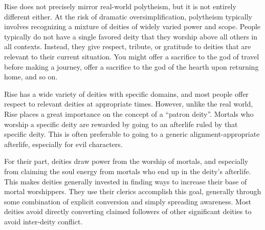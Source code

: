         Rise does not precisely mirror real-world polytheism, but it is not entirely different either.
        At the risk of dramatic oversimplification, polytheism typically involves recognizing a mixture of deities of widely varied power and scope.
        People typically do not have a single favored deity that they worship above all others in all contexts.
        Instead, they give respect, tribute, or gratitude to deities that are relevant to their current situation.
        You might offer a sacrifice to the god of travel before making a journey, offer a sacrifice to the god of the hearth upon returning home, and so on.

        Rise has a wide variety of deities with specific domains, and most people offer respect to relevant deities at appropriate times.
        However, unlike the real world, Rise places a great importance on the concept of a ``patron deity''.
        Mortals who worship a specific deity are rewarded by going to an afterlife ruled by that specific deity.
        This is often preferable to going to a generic alignment-appropriate afterlife, especially for evil characters.

        For their part, deities draw power from the worship of mortals, and especially from claiming the soul energy from mortals who end up in the deity's afterlife.
        This makes deities generally invested in finding ways to increase their base of mortal worshippers.
        They use their clerics accomplish this goal, generally through some combination of explicit conversion and simply spreading awareness.
        Most deities avoid directly converting claimed followers of other significant deities to avoid inter-deity conflict.

